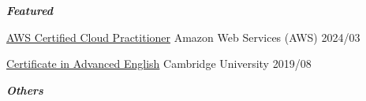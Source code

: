 
\textbf{\textit{Featured}}

\begin{cvcerts}

	\cvcert
	{\href{https://www.credly.com/badges/f19ebd37-79be-4d9e-807b-bb4a19b63187/public_url}{AWS Certified Cloud Practitioner}} %
	{Amazon Web Services (AWS)} %
	{} %
	{2024/03} %
		
	\cvcert
	{\href{https://1drv.ms/b/s!AkPthURenJLHi8Vx6tme1nLdTLFksw?e=fgHyIm}{Certificate in Advanced English}} %
	{Cambridge University} %
	{} %
	{2019/08} %


\end{cvcerts}

\vspace*{2mm}

\textbf{\textit{Others}}

